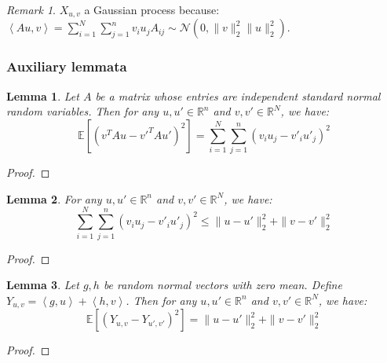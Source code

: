 \documentclass{article}
\newtheorem{lemma}{Lemma}[subsection]
\theoremstyle{remark}
\newtheorem*{remark}{Remark}
\newcommand{\real}{\mathbb{R}}
\newcommand{\Exp}{\mathbb{E}}
\newcommand{\inner}[2]{\left\langle #1, #2 \right\rangle}
\newcommand{\calN}{\mathcal{N}}
\begin{document}
\begin{remark}
\(X_{u, v}\) a Gaussian process because: \(\inner{Au}{v} = \sum\limits_{i=1}^{N}\sum\limits_{j=1}^{n}v_{i}u_{j}A_{ij} \sim \calN\left(0, \|v\|_{2}^{2}\|u\|_{2}^{2}\right)\).
\end{remark}

\subsubsection{Auxiliary lemmata}
\begin{lemma}
\label{lem:quadratic-random-mat-iid-entry}
Let \(A\) be a matrix whose entries are independent standard normal random variables. Then for any \(u, u' \in \real^{n}\) and \(v, v' \in \real^{N}\), we have:
\begin{equation*}
\Exp\left[(v^{T}Au - v'^{T}Au')^{2}\right] = \sum_{i=1}^{N}\sum_{j=1}^{n}(v_{i}u_{j} - v'_{i}u'_{j})^{2}
\end{equation*}
\end{lemma}
\begin{proof}

\end{proof}

\begin{lemma}
\label{lem:inner-to-norm}
For any \(u, u' \in \real^{n}\) and \(v, v' \in \real^{N}\), we have:
\begin{equation*}
\sum_{i=1}^{N}\sum_{j=1}^{n}(v_{i}u_{j} - v'_{i}u'_{j})^{2} \leq \|u - u'\|_{2}^{2} + \|v - v'\|_{2}^{2}
\end{equation*}
\end{lemma}
\begin{proof}

\end{proof}

\begin{lemma}
\label{lem:linear-random-vec}
Let \(g, h\) be random normal vectors with zero mean. Define \(Y_{u, v} = \inner{g}{u} + \inner{h}{v}\). Then for any \(u, u' \in \real^{n}\) and \(v, v' \in \real^{N}\), we have:
\begin{equation*}
\Exp\left[(Y_{u, v} - Y_{u', v'})^{2}\right] = \|u - u'\|_{2}^{2} + \|v - v'\|_{2}^{2}
\end{equation*}
\end{lemma}
\begin{proof}

\end{proof}
\end{document}
